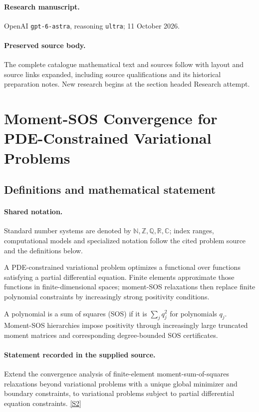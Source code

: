 \documentclass[11pt]{article}
\begin{document}
\paragraph{Research manuscript.} OpenAI \texttt{gpt-6-astra}, reasoning \texttt{ultra}; 11 October 2026.
\paragraph{Preserved source body.} The complete catalogue mathematical text and sources follow with layout and source links expanded, including source qualifications and its historical preparation notes. New research begins at the section headed Research attempt.

\section{Moment-SOS Convergence for PDE-Constrained Variational Problems}\label{statement}

\subsection{Definitions and mathematical statement}

\paragraph{Shared notation.}Standard number systems are denoted by $\mathbb N,\mathbb Z,\mathbb Q,\mathbb R,\mathbb C$; index ranges, computational models and specialized notation follow the cited problem source and the definitions below.


A PDE-constrained variational problem optimizes a functional over functions satisfying a partial differential equation. Finite elements approximate those functions in finite-dimensional spaces; moment-SOS relaxations then replace finite polynomial constraints by increasingly strong positivity conditions.

A polynomial is a sum of squares (SOS) if it is $\sum_j q_j^2$ for polynomials $q_j$. Moment-SOS hierarchies impose positivity through increasingly large truncated moment matrices and corresponding degree-bounded SOS certificates.
\paragraph{Statement recorded in the supplied source.}
Extend the convergence analysis of finite-element moment-sum-of-squares relaxations beyond variational problems with a unique global minimizer and boundary constraints, to variational problems subject to partial differential equation constraints. \href{https://doi.org/10.4171/owr/2024/35}{[S2]}
\end{document}
